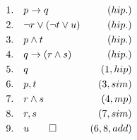 \begin{align*}
    1. \hspace{10pt} & p \rightarrow q & (hip.) \\
    2. \hspace{10pt} & \neg r \vee (\neg t \vee u) & (hip.) \\
    3. \hspace{10pt} & p \wedge t & (hip.) \\
    4. \hspace{10pt} & q \rightarrow (r \wedge s) & (hip.) \\
    5. \hspace{10pt} & q & (1, hip) \\
    6. \hspace{10pt} & p, t & (3, sim) \\
    7. \hspace{10pt} & r \wedge s & (4, mp) \\
    8. \hspace{10pt} & r, s & (7, sim) \\
    9. \hspace{10pt} & u \qed & (6, 8, add)
\end{align*}


























